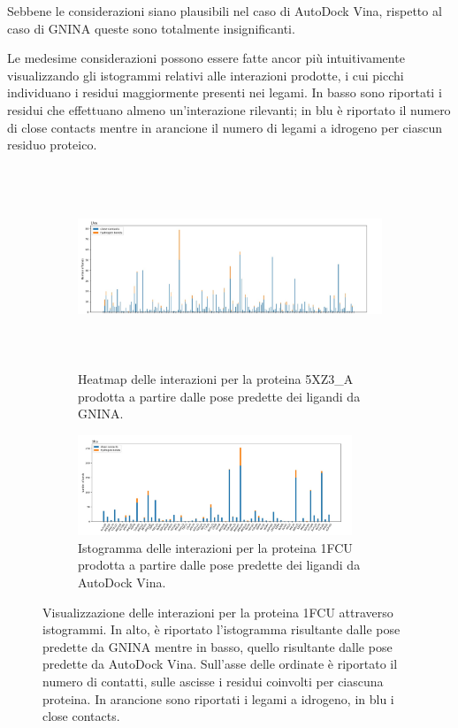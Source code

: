 Sebbene le considerazioni siano plausibili nel caso di AutoDock Vina, rispetto al caso di GNINA queste sono totalmente insignificanti.

Le medesime considerazioni possono essere fatte ancor più intuitivamente visualizzando gli istogrammi relativi alle interazioni prodotte, i cui picchi individuano i residui maggiormente presenti nei legami. In basso sono riportati i residui che effettuano almeno un'interazione rilevanti; in blu è riportato il numero di close contacts mentre in arancione il numero di legami a idrogeno per ciascun residuo proteico.

\begin{figure}
    \centering
    \begin{subfigure}[b]{\textwidth}
        \centering
        \includegraphics[width=\textwidth, height=6cm]{images/interactions/interactions_gnina_1fcu.jpg}
        \caption[]%
        {{\small Heatmap delle interazioni per la proteina 5XZ3\_A prodotta a partire dalle pose predette dei ligandi da GNINA.}}    
        \label{fig:interactions_gnina_1fcu}
    \end{subfigure}
    \hfill
    \begin{subfigure}[b]{\textwidth}  
        \centering 
        \includegraphics[width=0.9\textwidth, height=3cm]{images/interactions/interactions_vina_1fcu.jpg}
        \caption[]%
        {{\small Istogramma delle interazioni per la proteina 1FCU prodotta a partire dalle pose predette dei ligandi da AutoDock Vina.}}    
        \label{fig:interactions_vina_1fcu}
    \end{subfigure}
    \caption[Visualizzazione degli istogrammi per la proteina 1FCU.]
    {\small Visualizzazione delle interazioni per la proteina 1FCU attraverso istogrammi. In alto, è riportato l'istogramma risultante dalle pose predette da GNINA mentre in basso, quello risultante dalle pose predette da AutoDock Vina. Sull'asse delle ordinate è riportato il numero di contatti, sulle ascisse i residui coinvolti per ciascuna proteina. In arancione sono riportati i legami a idrogeno, in blu i close contacts. } 
    \label{fig:int_1fcu}
\end{figure}


